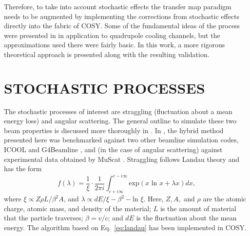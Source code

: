 \documentclass[a4paper,11pt]{article}
\begin{document}
Therefore, to take into account stochastic effects the transfer map paradigm needs to be augmented by implementing the corrections from stochastic effects directly into the fabric of COSY. Some of the fundamental ideas of the process were presented in \cite{errede} in application to quadrupole cooling channels, but the approximations used there were fairly basic. In this work, a more rigorous theoretical approach is presented along with the resulting validation. 

\section{STOCHASTIC PROCESSES}
The stochastic processes of interest are straggling (fluctuation about a mean energy loss) and angular scattering. The general outline to simulate these two beam properties is discussed more thoroughly in \cite{icap15}. In \cite{icap15}, the hybrid method presented here was benchmarked against two other beamline simulation codes, ICOOL \cite{ICOOL} and G4Beamline \cite{G4BL}, and (in the case of angular scattering) against experimental data obtained by MuScat \cite{Muscat}. Straggling follows Landau theory and has the form \cite{landau}
\begin{equation}
f(\lambda) = \frac{1}{\xi} \cdot \frac{1}{2\pi i} \int_{c+i \infty} ^{c-i \infty} \text{exp}(x\text{ ln } x + \lambda x) dx,
\label{eq:landau}
\end{equation}
where $\xi \propto Z\rho L/\beta^2 A$, and $\lambda \propto dE/\xi - \beta^2 - \text{ln } \xi$. Here, $Z, A,$ and $\rho$ are the atomic charge, atomic mass, and density of the material; $L$ is the amount of material that the particle traverses; $\beta=v/c$; and $dE$ is the fluctuation about the mean energy. The algorithm based on Eq.~\eqref{eq:landau} has been implemented in COSY.
\end{document}
